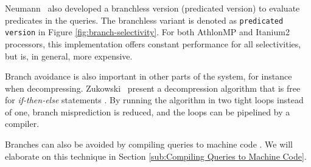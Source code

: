 Neumann \ea~also developed a branchless version (predicated version) to evaluate predicates in the queries. The branchless variant is denoted as \texttt{predicated version} in Figure \ref{fig:branch-selectivity}. For both AthlonMP and Itanium2 processors, this implementation offers constant performance for all selectivities, but is, in general, more expensive.

Branch avoidance is also important in other parts of the system, for instance when decompressing. Zukowski \ea~present a decompression algorithm that is free for \textit{if-then-else} statements \cite{Zukowski2006-oz}. By running the algorithm in two tight loops instead of one, branch misprediction is reduced, and the loops can be pipelined by a compiler.

Branches can also be avoided by compiling queries to machine code \cite{Lamb2012-kg}. We will elaborate on this technique in Section \ref{sub:Compiling Queries to Machine Code}.

